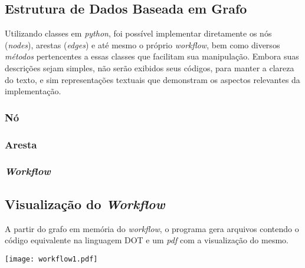\documentclass[a4paper,11pt]{article}
\begin{document}
    \newpage
	\subsection{Estrutura de Dados Baseada em Grafo}
        
		Utilizando classes em \emph{python}, foi possível implementar diretamente os n\'os (\emph{nodes}), arestas (\emph{edges}) e at\'e mesmo o pr\'oprio \emph{workflow}, bem como diversos \emph{m\'etodos} pertencentes a essas classes que facilitam sua manipulação. Embora suas descriç\~oes sejam simples, não serão exibidos seus c\'odigos, para manter a clareza do texto, e sim representaç\~oes textuais que demonstram os aspectos relevantes da implementação.

        \subsubsection*{N\'o}
            
        
        \subsubsection*{Aresta}
		  

        \subsubsection*{\emph{Workflow}}
            

	\newpage
	\subsection{Visualização do \emph{Workflow}}

		A partir do grafo em memória do \emph{workflow}, o programa gera arquivos contendo o código equivalente na linguagem DOT e um \emph{pdf} com a visualização do mesmo.\\


		\begin{minipage}[c]{0.4\textwidth}
			\centering
			
		\end{minipage}%
		\begin{minipage}[c]{0.7\textwidth}
			\centering
			\texttt{[image: workflow1.pdf]}
			\label{fig:pdf}
		\end{minipage}
\end{document}
